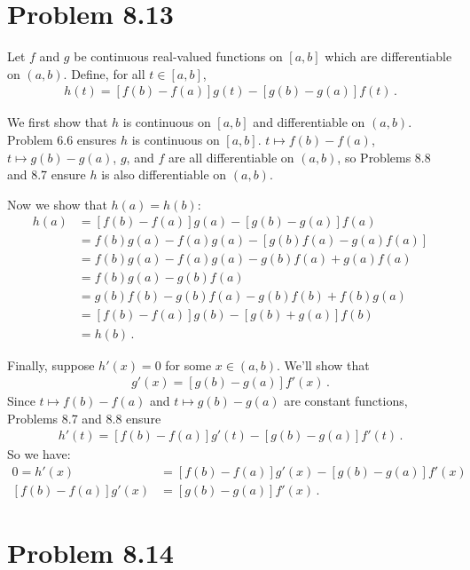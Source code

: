 \documentclass{article}
\begin{document}
\qedsymbol

\section*{Problem 8.13}

Let $f$ and $g$ be continuous real-valued functions on $[a,b]$
which are differentiable on $(a,b)$. Define, for all $t  \in [a,b]$,
\begin{align*}
    h(t) = [f(b) - f(a)]g(t) - [g(b) - g(a)]f(t) \,.
\end{align*}

We first show that $h$ is continuous on $[a,b]$ and differentiable on $(a,b)$.
Problem 6.6 ensures $h$ is continuous on $[a,b]$.
$t \mapsto f(b) - f(a)$, $t \mapsto g(b) - g(a)$, $g$, and $f$ are all differentiable
on $(a,b)$, so Problems 8.8 and 8.7 ensure $h$ is also differentiable on $(a,b)$.

Now we show that $h(a) = h(b)$:
\begin{align*}
    h(a) &= [f(b) - f(a)]g(a) - [g(b) - g(a)]f(a) \\
    &= f(b)g(a) - f(a)g(a) - [g(b)f(a) - g(a)f(a)] \\
    &= f(b)g(a) - f(a)g(a) - g(b)f(a) + g(a)f(a) \\
    &= f(b)g(a) - g(b)f(a) \\
    &= g(b)f(b) - g(b)f(a) - g(b)f(b) + f(b)g(a)  \\
    &= [f(b) - f(a)]g(b) - [g(b) + g(a)]f(b)  \\
    &= h(b) \,.
\end{align*}

Finally, suppose $h'(x) = 0$ for some $x \in (a,b)$. We'll show that
\begin{align*}
    [f(b) - f(a)]g'(x) = [g(b) - g(a)]f'(x) \,.
\end{align*}
Since $t \mapsto f(b) - f(a)$ and $t \mapsto g(b) -g(a)$ are constant functions,
Problems 8.7 and 8.8 ensure
\begin{align*}
    h'(t) = [f(b)-f(a)]g'(t) - [g(b)-g(a)]f'(t) \,.
\end{align*}
So we have:
\begin{align*}
    0 = h'(x) &= [f(b) - f(a)]g'(x) - [g(b) - g(a)]f'(x) \\
    [f(b) - f(a)]g'(x) &= [g(b) - g(a)]f'(x) \,.
\end{align*}

\qedsymbol

\section*{Problem 8.14}
\end{document}
